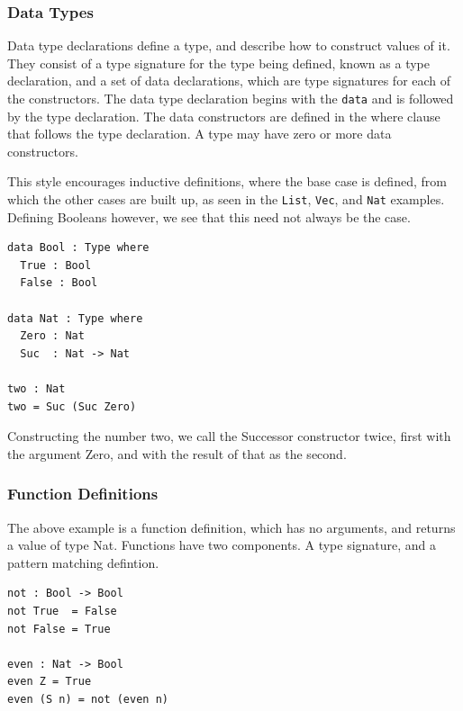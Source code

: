 \documentclass[a4paper]{article}
\begin{document}
\subsubsection{Data Types}
\label{sec:org0f565d7}
Data type declarations define a type, and describe how to construct
values of it. They consist of a type signature for the type being 
defined, known as a type declaration, and a set of data declarations, 
which are type signatures for each of the constructors.
The data type declaration begins with the \texttt{data} and is followed by 
the type declaration. The data constructors are defined in the where 
clause that follows the type declaration. A type may have zero or more
data constructors. 

This style encourages inductive definitions, where the base case is 
defined, from which the other cases are built up, as seen in the \texttt{List},
\texttt{Vec}, and \texttt{Nat} examples. Defining Booleans however, we see that this
need not always be the case. 

\begin{center}
\begin{verbatim}
data Bool : Type where
  True : Bool
  False : Bool

data Nat : Type where
  Zero : Nat
  Suc  : Nat -> Nat

two : Nat
two = Suc (Suc Zero)
\end{verbatim}
\end{center}

Constructing the number two, we call the Successor constructor twice, first with the argument Zero,
and with the result of that as the second. 

\subsubsection{Function Definitions}
\label{sec:org8a57296}
The above example is a function definition, which has no arguments,
and returns a value of type Nat. Functions have two components. 
A type signature, and a pattern matching defintion.

\begin{center}
\begin{verbatim}
not : Bool -> Bool
not True  = False
not False = True

even : Nat -> Bool
even Z = True
even (S n) = not (even n) 
\end{verbatim}
\end{center}
\end{document}
